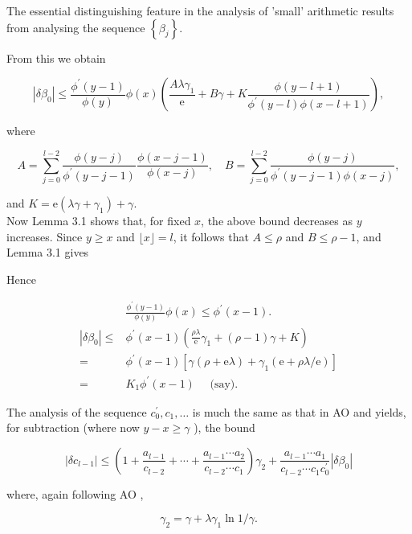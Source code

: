 \documentclass[10pt]{article}
\begin{document}
The essential distinguishing feature in the analysis of 'small' arithmetic results from analysing the sequence $\left\{\beta_{j}\right\}$.

From this we obtain

$$
\left|\delta \beta_{0}\right| \leqslant \frac{\phi^{\prime}(y-1)}{\phi(y)} \phi(x)\left(\frac{A \lambda \gamma_{1}}{\mathrm{e}}+B \gamma+K \frac{\phi(y-l+1)}{\phi^{\prime}(y-l) \phi(x-l+1)}\right),
$$

where

$$
A=\sum_{j=0}^{l-2} \frac{\phi(y-j)}{\phi^{\prime}(y-j-1)} \frac{\phi(x-j-1)}{\phi(x-j)}, \quad B=\sum_{j=0}^{l-2} \frac{\phi(y-j)}{\phi^{\prime}(y-j-1) \phi(x-j)},
$$

and $K=\mathrm{e}\left(\lambda \gamma+\gamma_{1}\right)+\gamma$.\\
Now Lemma 3.1 shows that, for fixed $x$, the above bound decreases as $y$ increases. Since $y \geqslant x$ and $\lfloor x\rfloor=l$, it follows that $A \leqslant \rho$ and $B \leqslant \rho-1$, and Lemma 3.1 gives

Hence


\begin{align*}
& \frac{\phi^{\prime}(y-1)}{\phi(y)} \phi(x) \leqslant \phi^{\prime}(x-1) . \\
\left|\delta \beta_{0}\right| \leqslant & \phi^{\prime}(x-1)\left(\frac{\rho \lambda}{\mathrm{e}} \gamma_{1}+(\rho-1) \gamma+K\right) \\
= & \phi^{\prime}(x-1)\left[\gamma(\rho+\mathrm{e} \lambda)+\gamma_{1}(\mathrm{e}+\rho \lambda / \mathrm{e})\right] \\
= & K_{1} \phi^{\prime}(x-1) \quad \text { (say). } \tag{3.6}
\end{align*}


The analysis of the sequence $c_{0}^{\prime}, c_{1}, \ldots$ is much the same as that in AO and yields, for subtraction (where now $y-x \geqslant \gamma$ ), the bound

$$
\left|\delta c_{l-1}\right| \leqslant\left(1+\frac{a_{l-1}}{c_{l-2}}+\cdots+\frac{a_{l-1} \cdots a_{2}}{c_{l-2} \cdots c_{1}}\right) \gamma_{2}+\frac{a_{l-1} \cdots a_{1}}{c_{l-2} \cdots c_{1} c_{0}^{\prime}}\left|\delta \beta_{0}\right|
$$

where, again following AO ,


\begin{equation*}
\gamma_{2}=\gamma+\lambda \gamma_{1} \ln 1 / \gamma . \tag{3.7}
\end{equation*}
\end{document}
